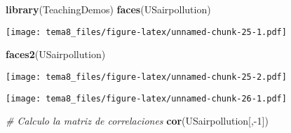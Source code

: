 \documentclass[]{article}
\newenvironment{Shaded}{\begin{snugshade}}{\end{snugshade}}
\newcommand{\KeywordTok}[1]{\textcolor[rgb]{0.13,0.29,0.53}{\textbf{{#1}}}}
\newcommand{\DataTypeTok}[1]{\textcolor[rgb]{0.13,0.29,0.53}{{#1}}}
\newcommand{\DecValTok}[1]{\textcolor[rgb]{0.00,0.00,0.81}{{#1}}}
\newcommand{\FloatTok}[1]{\textcolor[rgb]{0.00,0.00,0.81}{{#1}}}
\newcommand{\StringTok}[1]{\textcolor[rgb]{0.31,0.60,0.02}{{#1}}}
\newcommand{\CommentTok}[1]{\textcolor[rgb]{0.56,0.35,0.01}{\textit{{#1}}}}
\newcommand{\OtherTok}[1]{\textcolor[rgb]{0.56,0.35,0.01}{{#1}}}
\newcommand{\NormalTok}[1]{{#1}}
\numberwithin{equation}{section}
\begin{document}
\begin{Shaded}
\begin{Highlighting}[]
\KeywordTok{library}\NormalTok{(TeachingDemos)}
\KeywordTok{faces}\NormalTok{(USairpollution)}
\end{Highlighting}
\end{Shaded}

\texttt{[image: tema8\_files/figure-latex/unnamed-chunk-25-1.pdf]}

\begin{Shaded}
\begin{Highlighting}[]
\KeywordTok{faces2}\NormalTok{(USairpollution)}
\end{Highlighting}
\end{Shaded}

\texttt{[image: tema8\_files/figure-latex/unnamed-chunk-25-2.pdf]}

\begin{Shaded}
\end{Shaded}

\texttt{[image: tema8\_files/figure-latex/unnamed-chunk-26-1.pdf]}

\begin{Shaded}
\begin{Highlighting}[]
\CommentTok{# Calculo la matriz de correlaciones }
\KeywordTok{cor}\NormalTok{(USairpollution[,-}\DecValTok{1}\NormalTok{]) }
\end{Highlighting}
\end{Shaded}
\end{document}
